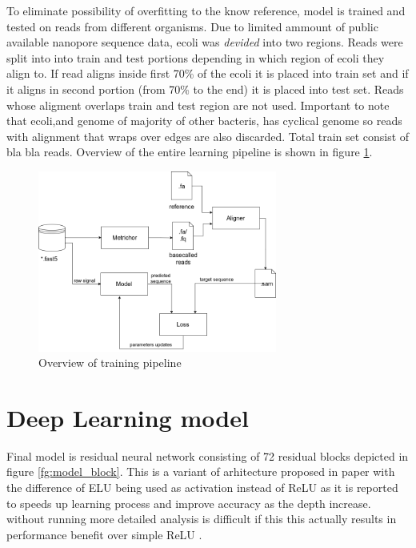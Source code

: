 \documentclass[times, utf8, diplomski, numeric, english]{fer}
\begin{document}
To eliminate possibility of overfitting to the know reference, model is trained and tested on reads from different organisms. Due to limited ammount of public available nanopore sequence data, ecoli was \textit{devided} into two regions.
Reads were split into into train and test portions depending in which region of ecoli they align to. 
If read aligns inside first 70\% of the ecoli it is placed into train set and if it aligns in second portion (from 70\% to the end) it is placed into test set. Reads whose aligment overlaps train and test region are not used. Important to note that ecoli,and genome of majority of other bacteris, has cyclical genome so reads with alignment that wraps over edges are also discarded. Total train set consist of bla bla reads.
Overview of the entire learning pipeline is shown in figure \ref{fg:train_pipe}.
\begin{figure}[!ht]
	\begin{center}
		\includegraphics[width=0.7\textwidth]{./imgs/train_pipeline.png}
		\caption{Overview of training pipeline}
		\label{fg:train_pipe}
	\end{center}
\end{figure}
\section{Deep Learning model}

Final model is residual neural network consisting of 72 residual blocks depicted in figure \ref{fg:model_block}. This is a variant of arhitecture proposed in paper \cite{identitet} with the difference of ELU being used as activation instead of ReLU as it is reported\cite{resnet-elu} to speeds up learning process and improve accuracy as the depth increase. 
without running more detailed analysis is difficult if this this actually results in performance benefit over simple ReLU .
\end{document}
